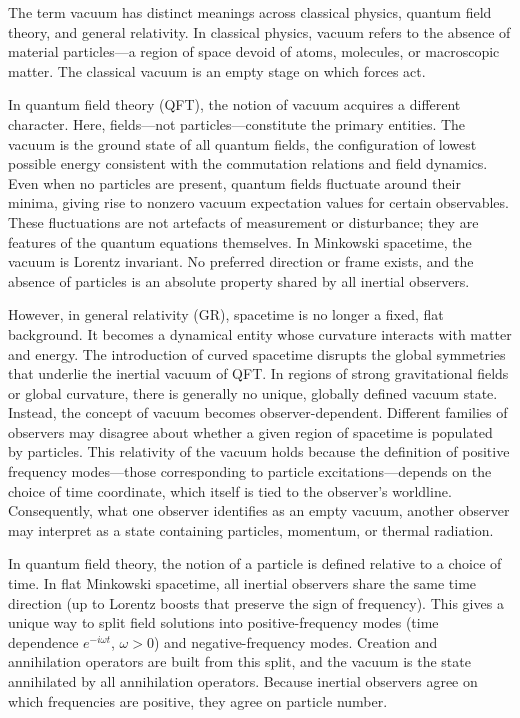 The term \QSOpen{}vacuum\QSClose{} has distinct meanings across classical physics, quantum field theory, and general relativity. In classical physics, vacuum refers to the absence of material particles—a region of space devoid of atoms, molecules, or macroscopic matter. The classical vacuum is an empty stage on which forces act.

In quantum field theory (QFT), the notion of vacuum acquires a different character. Here, fields—not particles—constitute the primary entities. The vacuum is the ground state of all quantum fields, the configuration of lowest possible energy consistent with the commutation relations and field dynamics. Even when no particles are present, quantum fields fluctuate around their minima, giving rise to nonzero vacuum expectation values for certain observables. These fluctuations are not artefacts of measurement or disturbance; they are features of the quantum equations themselves. In Minkowski spacetime, the vacuum is Lorentz invariant. No preferred direction or frame exists, and the absence of particles is an absolute property shared by all inertial observers.

However, in general relativity (GR), spacetime is no longer a fixed, flat background. It becomes a dynamical entity whose curvature interacts with matter and energy. The introduction of curved spacetime disrupts the global symmetries that underlie the inertial vacuum of QFT. In regions of strong gravitational fields or global curvature, there is generally no unique, globally defined vacuum state. Instead, the concept of vacuum becomes observer-dependent. Different families of observers may disagree about whether a given region of spacetime is populated by particles. This relativity of the vacuum holds because the definition of positive frequency modes—those corresponding to particle excitations—depends on the choice of time coordinate, which itself is tied to the observer's worldline. Consequently, what one observer identifies as an empty vacuum, another observer may interpret as a state containing particles, momentum, or thermal radiation.

In quantum field theory, the notion of a particle is defined relative to a choice of time. In flat Minkowski spacetime, all inertial observers share the same time direction (up to Lorentz boosts that preserve the sign of frequency). This gives a unique way to split field solutions into positive-frequency modes (time dependence $e^{-i\omega t}$, $\omega > 0$) and negative-frequency modes. Creation and annihilation operators are built from this split, and the vacuum is the state annihilated by all annihilation operators. Because inertial observers agree on which frequencies are positive, they agree on particle number.

